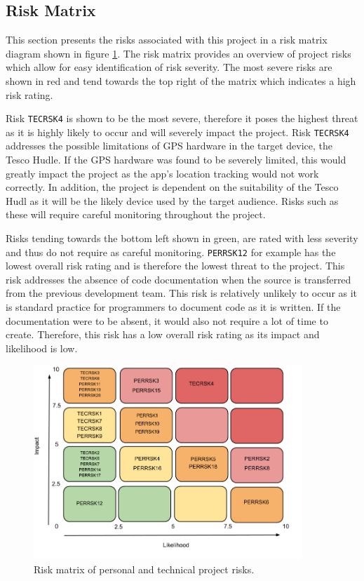 \documentclass[11pt,a4paper]{article}
\begin{document}
\subsection{Risk Matrix}
\label{sec:risk-matrix}

This section presents the risks associated with this project in a risk matrix diagram shown in figure \ref{fig:RiskMatrix}. The risk matrix provides an overview of project risks which allow for easy identification of risk severity. The most severe risks are shown in red and tend towards the top right of the matrix which indicates a high risk rating.

Risk \texttt{TECRSK4} is shown to be the most severe, therefore it poses the highest threat as it is highly likely to occur and will severely impact the project. Risk \texttt{TECRSK4}  addresses the possible limitations of GPS hardware in the target device, the Tesco Hudle. If the GPS hardware was found to be severely limited, this would greatly impact the project as the app's location tracking would not work correctly. In addition, the project is dependent on the suitability of the Tesco Hudl as it will be the likely device used by the target audience. Risks such as these will require careful monitoring throughout the project. 

Risks tending towards the bottom left shown in green, are rated with less severity and thus do not require as careful monitoring. \texttt{PERRSK12} for example has the lowest overall risk rating and is therefore the lowest threat to the project. This risk addresses the absence of code documentation when the source is transferred from the previous development team. This risk is relatively unlikely to occur as it is standard practice for programmers to document code as it is written. If the documentation were to be absent, it would also not require a lot of time to create. Therefore, this risk has a low overall risk rating as its impact and likelihood is low.

\begin{figure}[h!]
\centering
\includegraphics[width=0.9\textwidth]{./img/RiskMatrix}
\caption{Risk matrix of personal and technical project risks.}
\label{fig:RiskMatrix}
\end{figure}
\end{document}
